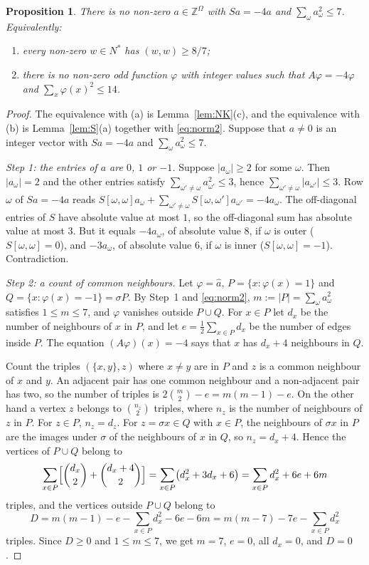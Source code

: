 \documentclass[11pt,a4paper]{article}
\newtheorem{proposition}[theorem]{Proposition}
\theoremstyle{definition}
\theoremstyle{remark}
\newcommand{\ZZ}{\mathbb{Z}}
\newcommand{\sg}{\sigma}
\newcommand{\Om}{\Omega}
\begin{document}
\begin{proposition}\label{prop:min}
There is no non-zero $a\in\ZZ^{\Om}$ with $Sa=-4a$ and $\sum_\omega a_\omega^2\le7$. Equivalently:
\begin{enumerate}[label=\textup{(\alph*)}]
\item every non-zero $w\in N^*$ has $(w,w)\ge 8/7$;
\item there is no non-zero odd function $\varphi$ with integer values such that $A\varphi=-4\varphi$ and
$\sum_x\varphi(x)^2\le14$.
\end{enumerate}
\end{proposition}
\begin{proof}
The equivalence with (a) is Lemma~\ref{lem:NK}(c), and the equivalence with (b) is Lemma~\ref{lem:S}(a) together
with \eqref{eq:norm2}. Suppose that $a\ne0$ is an integer vector with $Sa=-4a$ and $\sum_\omega a_\omega^2\le7$.

\medskip\noindent\emph{Step 1: the entries of $a$ are $0$, $1$ or $-1$.}
Suppose $|a_\omega|\ge2$ for some $\omega$. Then $|a_\omega|=2$ and the other entries satisfy
$\sum_{\omega'\ne\omega}a_{\omega'}^2\le3$, hence $\sum_{\omega'\ne\omega}|a_{\omega'}|\le3$. Row $\omega$ of
$Sa=-4a$ reads $S[\omega,\omega]a_\omega+\sum_{\omega'\ne\omega}S[\omega,\omega']a_{\omega'}=-4a_\omega$. The
off-diagonal entries of $S$ have absolute value at most $1$, so the off-diagonal sum has absolute value at most $3$.
But it equals $-4a_\omega$, of absolute value $8$, if $\omega$ is outer ($S[\omega,\omega]=0$), and $-3a_\omega$, of
absolute value $6$, if $\omega$ is inner ($S[\omega,\omega]=-1$). Contradiction.

\medskip\noindent\emph{Step 2: a count of common neighbours.}
Let $\varphi=\hat a$, $P=\{x:\varphi(x)=1\}$ and $Q=\{x:\varphi(x)=-1\}=\sg P$. By Step~1 and \eqref{eq:norm2},
$m:=|P|=\sum_\omega a_\omega^2$ satisfies $1\le m\le7$, and $\varphi$ vanishes outside $P\cup Q$. For $x\in P$ let
$d_x$ be the number of neighbours of $x$ in $P$, and let $e=\frac12\sum_{x\in P}d_x$ be the number of edges inside
$P$. The equation $(A\varphi)(x)=-4$ says that $x$ has $d_x+4$ neighbours in $Q$.

Count the triples $(\{x,y\},z)$ where $x\ne y$ are in $P$ and $z$ is a common neighbour of $x$ and $y$. An adjacent
pair has one common neighbour and a non-adjacent pair has two, so the number of triples is
$2\binom m2-e=m(m-1)-e$. On the other hand a vertex $z$ belongs to $\binom{n_z}{2}$ triples, where $n_z$ is the
number of neighbours of $z$ in $P$. For $z\in P$, $n_z=d_z$. For $z=\sg x\in Q$ with $x\in P$, the neighbours of
$\sg x$ in $P$ are the images under $\sg$ of the neighbours of $x$ in $Q$, so $n_z=d_x+4$. Hence the vertices of
$P\cup Q$ belong to
\[
\sum_{x\in P}\Bigl[\binom{d_x}{2}+\binom{d_x+4}{2}\Bigr]=\sum_{x\in P}\bigl(d_x^2+3d_x+6\bigr)
=\sum_{x\in P}d_x^2+6e+6m
\]
triples, and the vertices outside $P\cup Q$ belong to
\[
D=m(m-1)-e-\sum_{x\in P}d_x^2-6e-6m=m(m-7)-7e-\sum_{x\in P}d_x^2
\]
triples. Since $D\ge0$ and $1\le m\le7$, we get $m=7$, $e=0$, all $d_x=0$, and $D=0$.


\end{proof}
\end{document}
